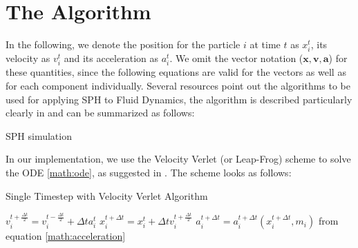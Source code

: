 \documentclass{sigchi}
\begin{document}
\section{The Algorithm}
%
In the following, we denote the position for the particle $i$ at time $t$ as $x_i^t$, its velocity as $v_i^t$ and its acceleration as $a_i^t$.
We omit the vector notation ($\boldsymbol{x},\boldsymbol{v},\boldsymbol{a}$) for these quantities, since the following equations are valid for the vectors as well as for each component individually.
%
Several resources point out the algorithms to be used for applying SPH to Fluid Dynamics, the algorithm is described particularly clearly in \cite{kennyerleben} and can be summarized as follows:
%
\FloatBarrier
\begin{algorithm}
	\caption{SPH simulation}
\end{algorithm}
\FloatBarrier
%
In our implementation, we use the Velocity Verlet (or Leap-Frog) scheme to solve the ODE \ref{math:ode}, as suggested in \cite{generalizedwallboundary}.
The scheme looks as follows:
%
\begin{algorithm}
	\caption{Single Timestep with Velocity Verlet Algorithm}
	$v_i^{t+\frac{\Delta t}{2}} = v_i^{t - \frac{\Delta t}{2}} + \Delta t a_i^t$ \;
	$x_i^{t+\Delta t} = x_i^t + \Delta t v_i^{t+\frac{\Delta t}{2}}$ \;	
	$a_i^{t + \Delta t} = a_i^{t + \Delta t} (x_i^{t + \Delta t}, m_i)$ from equation \ref{math:acceleration} \;
\end{algorithm}
\end{document}
